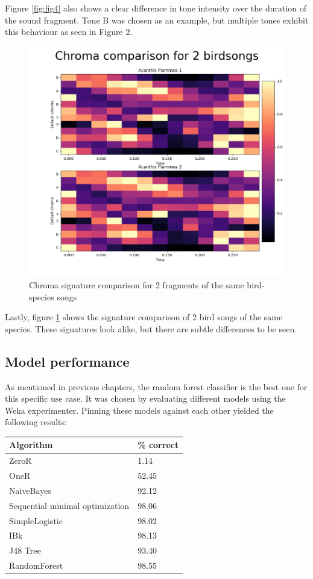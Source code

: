 \documentclass[
]{article}
\begin{document}
Figure \ref{fig:fig4} also shows a clear difference in tone intensity
over the duration of the sound fragment. Tone B was chosen as an
example, but multiple tones exhibit this behaviour as seen in Figure 2.

\newpage

\begin{figure}
\centering\includegraphics[width=\linewidth]{../figures/chroma_comparison_same.png}
\caption{Chroma signature comparison for 2 fragments of the same bird-species songs}
\label{fig:fig5}
\end{figure}

Lastly, figure \ref{fig:fig5} shows the signature comparison of 2 bird
songs of the same species. These signatures look alike, but there are
subtle differences to be seen.

\newpage

\hypertarget{model-performance}{%
\subsection{Model performance}\label{model-performance}}

As mentioned in previous chapters, the random forest classifier is the
best one for this specific use case. It was chosen by evaluating
different models using the Weka experimenter. Pinning these models
against each other yielded the following results:

\begin{longtable}[]{@{}ll@{}}
\toprule
Algorithm & \% correct \\
\midrule
\endhead
ZeroR & 1.14 \\
OneR & 52.45 \\
NaiveBayes & 92.12 \\
Sequential minimal optimization & 98.06 \\
SimpleLogistic & 98.02 \\
IBk & 98.13 \\
J48 Tree & 93.40 \\
RandomForest & 98.55 \\
\bottomrule
\end{longtable}
\end{document}
